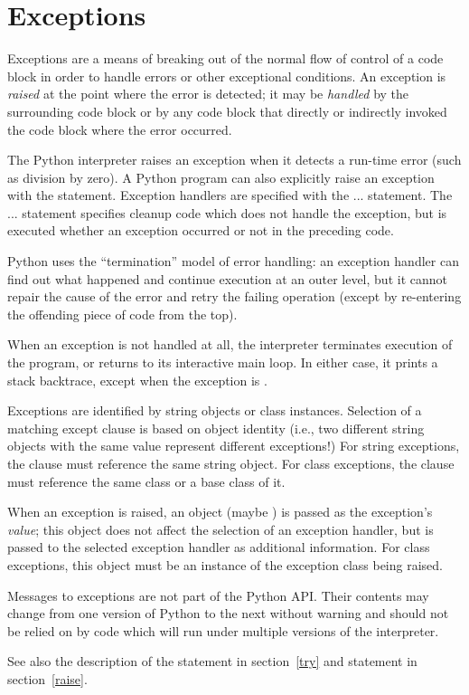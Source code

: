 \section{Exceptions \label{exceptions}}

Exceptions are a means of breaking out of the normal flow of control
of a code block in order to handle errors or other exceptional
conditions.  An exception is
\emph{raised} at the point where the error
is detected; it may be \emph{handled} by
the surrounding code block or by any code block that directly or
indirectly invoked the code block where the error occurred.

The Python interpreter raises an exception when it detects a run-time
error (such as division by zero).  A Python program can also
explicitly raise an exception with the  statement.
Exception handlers are specified with the  ... 
statement.  The  ...  statement
specifies cleanup code which does not handle the exception, but is
executed whether an exception occurred or not in the preceding code.

Python uses the ``termination'' model of
error handling: an exception handler can find out what happened and
continue execution at an outer level, but it cannot repair the cause
of the error and retry the failing operation (except by re-entering
the offending piece of code from the top).

When an exception is not handled at all, the interpreter terminates
execution of the program, or returns to its interactive main loop.  In
either case, it prints a stack backtrace, except when the exception is 
.

Exceptions are identified by string objects or class instances.
Selection of a matching except clause is based on object identity
(i.e., two different string objects with the same value represent
different exceptions!)  For string exceptions, the 
clause must reference the same string object.  For class exceptions,
the  clause must reference the same class or a base
class of it.

When an exception is raised, an object (maybe ) is passed
as the exception's \emph{value}; this object does not affect the
selection of an exception handler, but is passed to the selected
exception handler as additional information.  For class exceptions,
this object must be an instance of the exception class being raised.

\begin{notice}[warning]
Messages to exceptions are not part of the Python API.  Their contents may
change from one version of Python to the next without warning and should not
be relied on by code which will run under multiple versions of the
interpreter.
\end{notice}

See also the description of the  statement in
section~\ref{try} and  statement in
section~\ref{raise}.
